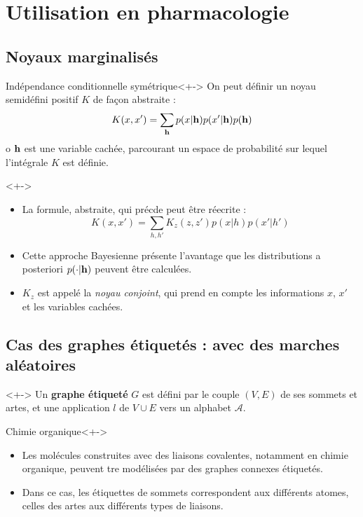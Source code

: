 \section{Utilisation en pharmacologie}

\subsection{Noyaux marginalis\'es}

\begin{frame}
\begin{block}{Ind\'ependance conditionnelle sym\'etrique}<+->
On peut d\'efinir un noyau semid\'efini positif $K$ de fa\c con abstraite :
\[K(x,x')=\sum\limits_{\mathbf{h}}p(x|\mathbf{h})p(x'|\mathbf{h})p(\mathbf{h})\]
o $\mathbf{h}$ est une variable cach\'ee, parcourant un espace de probabilit\'e sur lequel l'int\'egrale $K$ est d\'efinie.
\end{block}
\end{frame}
\begin{frame}
\begin{definition}<+->
\begin{itemize}
\item<+-> La formule, abstraite, qui pr\'ecde peut \^etre r\'eecrite : %
\[K(x,x')=\sum\limits_{h,h'}K_z(z,z')p(x|h)p(x'|h')\]
\item<+-> Cette approche Bayesienne pr\'esente l'avantage que les distributions a posteriori $p(\cdot|\mathbf{h})$ peuvent \^etre calcul\'ees.
\item<+-> $K_z$ est appel\'e la \emph{noyau conjoint}, qui prend en compte les informations $x$, $x'$ et les variables cach\'ees.
\end{itemize}
\end{definition}
\end{frame}

\subsection{Cas des graphes \'etiquet\'es : avec des marches al\'eatoires}

\begin{frame}
\begin{definition}<+->
Un \textbf{graphe \'etiquet\'e} $G$ est d\'efini par le couple $(V,E)$ de ses sommets et artes, et une application $l$ de $V\cup E$ vers un alphabet $\mathcal{A}$.
\end{definition}
\begin{block}{Chimie organique}<+->
\begin{itemize}
\item<+-> Les mol\'ecules construites avec des liaisons covalentes, notamment en chimie organique, peuvent tre mod\'elis\'ees par des graphes connexes \'etiquet\'es.
\item<+-> Dans ce cas, les \'etiquettes de sommets correspondent aux diff\'erents atomes, celles des artes aux diff\'erents types de liaisons.
\end{itemize}
\end{block}
\end{frame}

